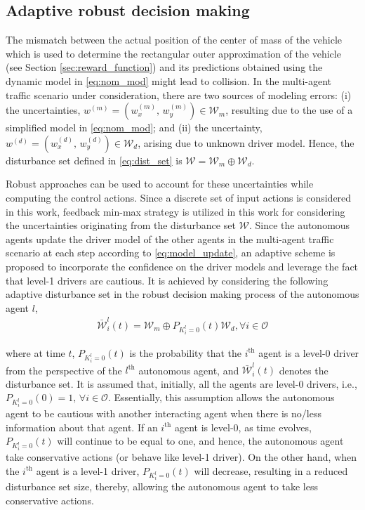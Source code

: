 \documentclass[10pt,journal]{IEEEtran}
\newcommand{\nth}[1]{$#1^{\textrm{th}}$}
\begin{document}
	\subsection{Adaptive robust decision making}

	The mismatch between the actual position of the center of mass of the vehicle which is used to determine the rectangular outer approximation of the vehicle (see Section \ref{sec:reward_function}) and its predictions obtained using the dynamic model in \eqref{eq:nom_mod} might lead to collision. In the multi-agent traffic scenario under consideration, there are two sources of modeling errors: (i) the uncertainties, $w^{(m)} = \left(w_x^{(m)},\,w_y^{(m)}\right) \in \mathcal{W}_m$, resulting due to the use of a simplified model in \eqref{eq:nom_mod}; and (ii) the uncertainty, $w^{(d)} = \left(w_x^{(d)},\,w_y^{(d)}\right) \in \mathcal{W}_d$, arising due to unknown driver model. Hence, the disturbance set defined in \eqref{eq:dist_set} is $\mathcal{W} = \mathcal{W}_m \oplus \mathcal{W}_d$. 	
	
	
	Robust approaches can be used to account for these uncertainties while computing the control actions. Since a discrete set of input actions is considered in this work, feedback min-max strategy \cite{Scokaert1998} is utilized in this work for considering the uncertainties originating from the disturbance set $\mathcal{W}$. Since the autonomous agents update the driver model of the other agents in the multi-agent traffic scenario at each step according to \eqref{eq:model_update}, an adaptive scheme is proposed to incorporate the confidence on the driver models and leverage the fact that level-1 drivers are cautious. It is achieved by considering the following adaptive disturbance set in the robust decision making process of the autonomous agent $l$,
	\begin{align}
		\bar{\mathcal{W}}_{i}^{l}(t) = \mathcal{W}_m \oplus P_{K_{i}^l = 0}(t) \mathcal{W}_d, \forall i \in \mathcal{O}
	\end{align}

	\noindent where at time $t$, $P_{K_{i}^l = 0} (t) $ is the probability that the \nth{i} agent is a level-0 driver from the perspective of the \nth{l} autonomous agent, and $\bar{\mathcal{W}}_{i}^{l}(t)$ denotes the disturbance set. It is assumed that, initially, all the agents are level-0 drivers, i.e., $P_{K_{i}^l = 0} (0) = 1,\, \forall i \in \mathcal{O}$. Essentially, this assumption allows the autonomous agent to be cautious with another interacting agent when there is no/less information about that agent. If an \nth{i} agent is level-0, as time evolves, $P_{K_{i}^l = 0} (t)$ will continue to be equal to one, and hence, the autonomous agent take conservative actions (or behave like level-1 driver). On the other hand, when the \nth{i} agent is a level-1 driver, $P_{K_{i}^l = 0} (t)$ will decrease, resulting in a reduced disturbance set size, thereby, allowing the autonomous agent to take less conservative actions.
\end{document}
